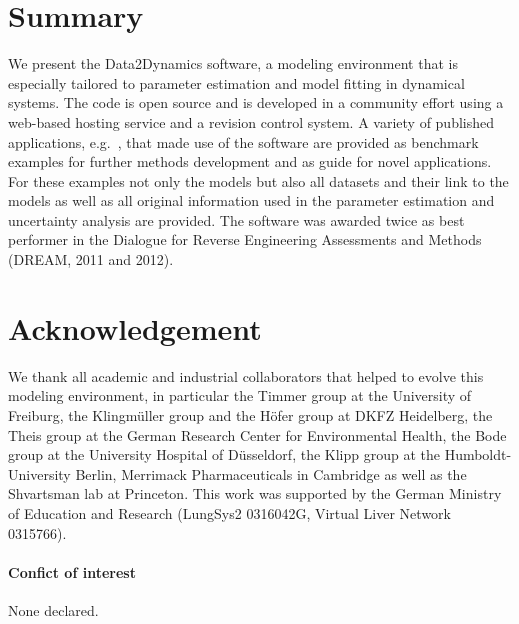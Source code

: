\documentclass{bioinfo}
\begin{document}
\section{Summary}
We present the Data2Dynamics software, a modeling environment that is especially tailored to parameter estimation and model fitting in dynamical systems. The code is open source and is developed in a community effort using a web-based hosting service and a revision control system. A variety of published applications, e.g.~\citet{Becker:2010hs, Raia:2011vn, Bachmann:2011fk}, that made use of the software are provided as benchmark examples for further methods development and as guide for novel applications. For these examples not only the models but also all datasets and their link to the models as well as all original information used in the parameter estimation and uncertainty analysis are provided. The software was awarded twice as best performer in the Dialogue for Reverse Engineering Assessments and Methods (DREAM, 2011 and 2012).

\section*{Acknowledgement}
We thank all academic and industrial collaborators that helped to evolve this modeling environment, in particular the Timmer group at the University of Freiburg, the Klingm\"uller group and the H\"ofer group at DKFZ Heidelberg, the Theis group at the German Research Center for Environmental Health, the Bode group at the University Hospital of D\"usseldorf, the Klipp group at the Humboldt-University Berlin, Merrimack Pharmaceuticals in Cambridge as well as the Shvartsman lab at Princeton. 
%
This work was supported by the German Ministry of Education and Research (LungSys2 0316042G, Virtual Liver Network 0315766).

\paragraph{Confict of interest\textcolon} None declared.



\end{document}
